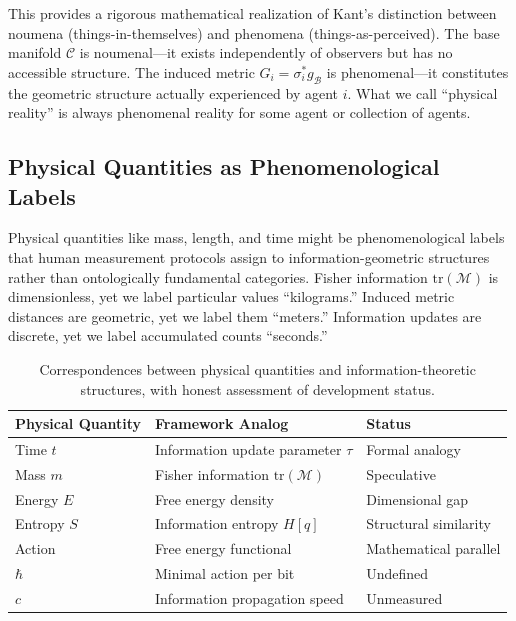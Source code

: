 \documentclass[11pt]{article}
\begin{document}
This provides a rigorous mathematical realization of Kant's distinction between noumena (things-in-themselves) and phenomena (things-as-perceived). The base manifold $\mathcal{C}$ is noumenal---it exists independently of observers but has no accessible structure. The induced metric $G_i = \sigma_i^* g_{\mathcal{B}}$ is phenomenal---it constitutes the geometric structure actually experienced by agent $i$. What we call ``physical reality'' is always phenomenal reality for some agent or collection of agents.

\subsection{Physical Quantities as Phenomenological Labels}

Physical quantities like mass, length, and time might be phenomenological labels that human measurement protocols assign to information-geometric structures rather than ontologically fundamental categories. Fisher information $\mathrm{tr}(\mathcal{M})$ is dimensionless, yet we label particular values ``kilograms.'' Induced metric distances are geometric, yet we label them ``meters.'' Information updates are discrete, yet we label accumulated counts ``seconds.''

\begin{table}[h]
\centering
\begin{tabular}{|l|l|l|}
\hline
\textbf{Physical Quantity} & \textbf{Framework Analog} & \textbf{Status} \\
\hline
Time $t$ & Information update parameter $\tau$ & Formal analogy \\
Mass $m$ & Fisher information $\mathrm{tr}(\mathcal{M})$ & Speculative \\
Energy $E$ & Free energy density & Dimensional gap \\
Entropy $S$ & Information entropy $H[q]$ & Structural similarity \\
Action & Free energy functional & Mathematical parallel \\
$\hbar$ & Minimal action per bit & Undefined \\
$c$ & Information propagation speed & Unmeasured \\
\hline
\end{tabular}
\caption{Correspondences between physical quantities and information-theoretic structures, with honest assessment of development status.}
\label{tab:physical_correspondences}
\end{table}
\end{document}
